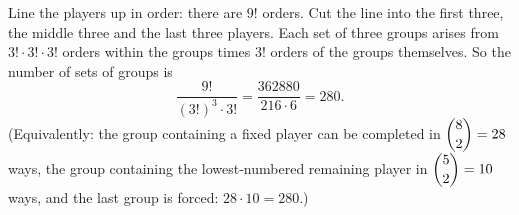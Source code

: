 Line the players up in order: there are $9!$ orders. Cut the line into the first three, the middle three and the last three players. Each set of three groups arises from $3!\cdot3!\cdot3!$ orders within the groups times $3!$ orders of the groups themselves. So the number of sets of groups is
\[
\dfrac{9!}{(3!)^3\cdot3!}=\dfrac{362880}{216\cdot6}=\boxed{280}.
\]
(Equivalently: the group containing a fixed player can be completed in $\dbinom82=28$ ways, the group containing the lowest-numbered remaining player in $\dbinom52=10$ ways, and the last group is forced: $28\cdot10=280$.)
